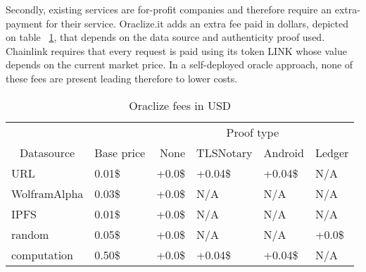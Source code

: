 Secondly, existing services are for-profit companies and therefore require an extra-payment for their service. Oraclize.it adds an extra fee paid in dollars, depicted on table ~\ref{tab:oraclize-fees}, that depends on the data source and authenticity proof used. Chainlink requires that every request is paid using its token LINK whose value depends on the current market price. In a self-deployed oracle approach, none of these fees are present leading therefore to lower costs.

\begin{table}
    \centering
    \begin{tabular}{@{}llllll@{}}
        \cmidrule(l){3-6}
                                       & \multicolumn{1}{l|}{}          & \multicolumn{4}{c|}{Proof type}                                                                                            \\ \cmidrule(r){1-2}
        \multicolumn{1}{c}{Datasource} & \multicolumn{1}{c}{Base price} & \multicolumn{1}{r}{None}        & \multicolumn{1}{r}{TLSNotary} & \multicolumn{1}{r}{Android} & \multicolumn{1}{r}{Ledger} \\ \midrule
        URL                            & 0.01\$                         & +0.0\$                          & +0.04\$                       & +0.04\$                     & N/A                        \\
        WolframAlpha                   & 0.03\$                         & +0.0\$                          & N/A                           & N/A                         & N/A                        \\
        IPFS                           & 0.01\$                         & +0.0\$                          & N/A                           & N/A                         & N/A                        \\
        random                         & 0.05\$                         & +0.0\$                          & N/A                           & N/A                         & +0.0\$                     \\
        computation                    & 0.50\$                         & +0.0\$                          & +0.04\$                       & +0.04\$                     & N/A                        \\ \bottomrule
    \end{tabular}
    \caption{Oraclize fees in USD}
    \label{tab:oraclize-fees}
\end{table}

